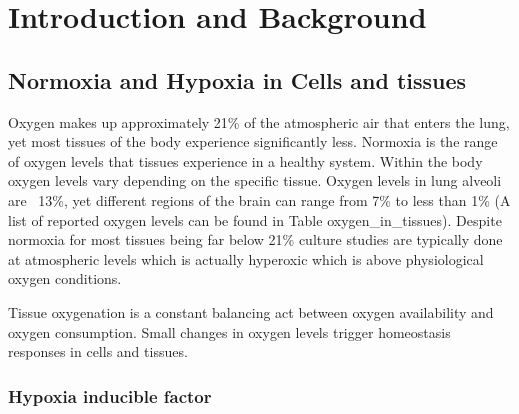 
\chapter{Introduction and Background} %

\label{Chapter1} %



\section{Normoxia and Hypoxia in Cells and tissues}

Oxygen makes up approximately 21\% of the atmospheric air that enters the lung, yet most tissues of the body experience significantly less.
Normoxia is the range of oxygen levels that tissues experience in a healthy system.
Within the body oxygen levels vary depending on the specific tissue.
Oxygen levels in lung alveoli are ~13\%, yet different regions of the brain can range from 7\% to less than 1\% (A list of reported oxygen levels can be found in Table oxygen_in_tissues).
Despite normoxia for most tissues being far below 21\% culture studies are typically done at atmospheric levels which is actually hyperoxic which is above physiological oxygen conditions.

Tissue oxygenation is a constant balancing act between oxygen availability and oxygen consumption.
Small changes in oxygen levels trigger homeostasis responses in cells and tissues.



\subsection{Hypoxia inducible factor}


